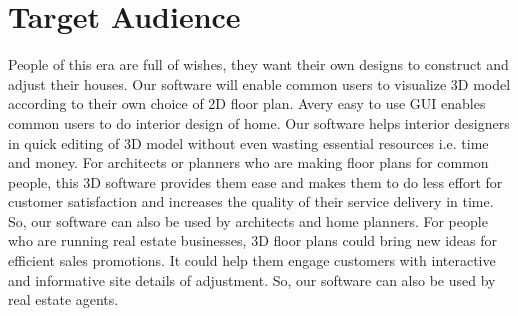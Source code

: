 \documentclass{article}
\begin{document}
\section{Target Audience}

People of this era are full of wishes, they want their own designs to construct and adjust their houses.  Our software will enable common users to visualize 3D model according to their own choice of 2D floor plan. Avery easy to use GUI enables common users to do interior design of home.
Our software helps interior designers in quick editing of 3D model without even wasting essential resources i.e. time and money.
For architects or planners who are making floor plans for common people, this 3D software provides them ease and makes them to do less effort for customer satisfaction and increases the quality of  their service delivery in time. So, our software can also be used by architects and home planners.
For people who are running real estate businesses, 3D floor plans could bring new ideas for efficient sales promotions. It could help them engage customers with interactive and informative site details of adjustment. So, our software can also be used by real estate agents.
\end{document}
